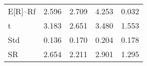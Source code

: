 \begin{tabular}{lrrrr}
\toprule
\midrule
E[R]--Rf & 2.596 & 2.709 & 4.253 & 0.032 \\
t & 3.183 & 2.651 & 3.480 & 1.553 \\
Std & 0.136 & 0.170 & 0.204 & 0.178 \\
SR & 2.654 & 2.211 & 2.901 & 1.295 \\
\bottomrule
\end{tabular}
